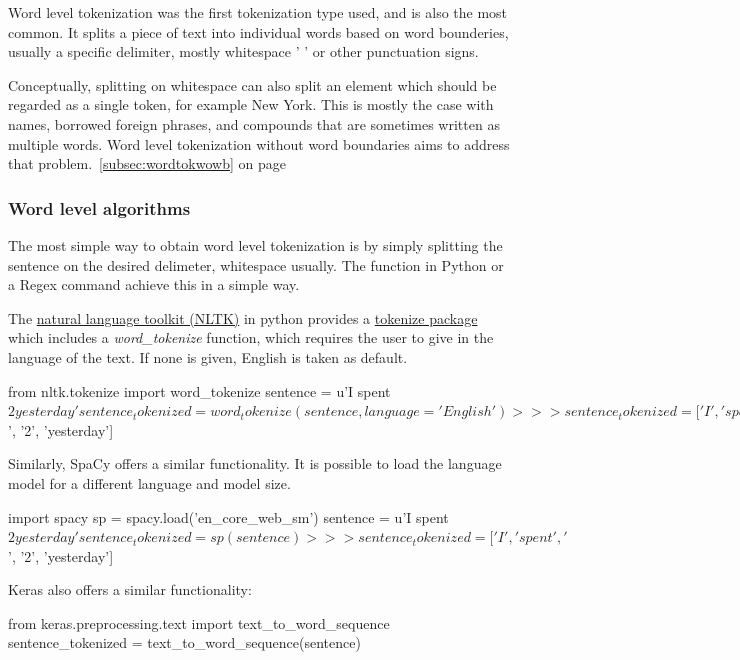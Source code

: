 Word level tokenization was the first tokenization type used, and is also the most common. It splits a piece of text into individual words based on word bounderies, usually a specific delimiter, mostly whitespace ' ' or other punctuation signs.

Conceptually, splitting on whitespace can also split an element which should be regarded as a single token, for example New York. This is mostly the case with names, borrowed foreign phrases, and compounds that are sometimes written as multiple words. Word level tokenization without word boundaries aims to address that problem.~\ref{subsec:wordtokwowb} on page~\pageref{subsec:wordtokwowb}

\subsubsection{Word level algorithms}

The most simple way to obtain word level tokenization is by simply splitting the sentence on the desired delimeter, whitespace usually. The  function in Python or a Regex command  achieve this in a simple way.

The \href{https://www.nltk.org/}{natural language toolkit (NLTK)} in python provides a \href{https://www.nltk.org/api/nltk.tokenize.html}{tokenize package} which includes a \emph{word\_tokenize} function, which requires the user to give in the language of the text. If none is given, English is taken as default.

\begin{python}
from nltk.tokenize import word_tokenize
sentence = u'I spent $2 yesterday'
sentence_tokenized = word_tokenize(sentence, language='English')
>>> sentence_tokenized = ['I', 'spent', '$', '2', 'yesterday']
\end{python}

Similarly, SpaCy offers a similar functionality. It is possible to load the language model for a different language and model size.

\begin{python}
import spacy
sp = spacy.load('en_core_web_sm')
sentence = u'I spent $2 yesterday'
sentence_tokenized = sp(sentence)
>>> sentence_tokenized = ['I', 'spent', '$', '2', 'yesterday']
\end{python}

Keras also offers a similar functionality:

\begin{python}
from keras.preprocessing.text import text_to_word_sequence
sentence_tokenized = text_to_word_sequence(sentence)
\end{python}

